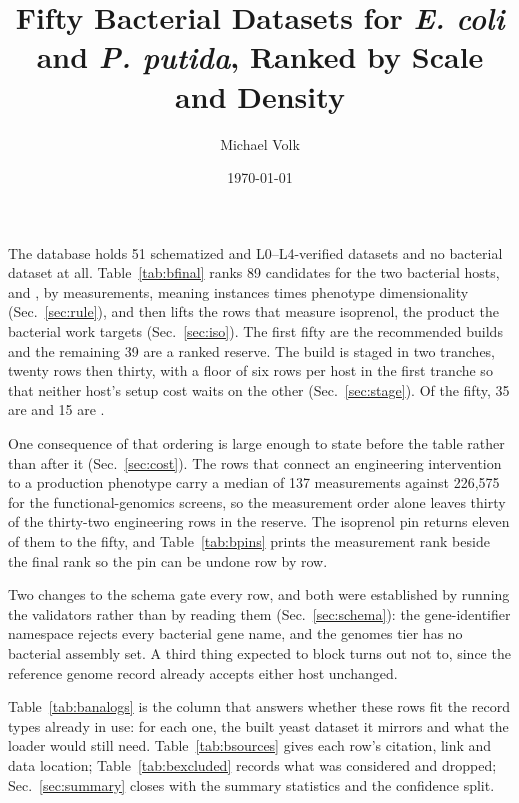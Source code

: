 \documentclass[10pt,a4paper]{article}
\title{\vspace{-1.5em}Fifty Bacterial Datasets for \emph{E. coli} and \emph{P. putida},
Ranked by Scale and Density}
\author{Michael Volk}
\date{\today}
\begin{document}
\maketitle
\thispagestyle{empty}

\noindent
The database holds 51 schematized and L0--L4-verified 
datasets and no bacterial dataset at all. Table~\ref{tab:bfinal} ranks 89 candidates for
the two bacterial hosts,  and , by
measurements, meaning instances times phenotype dimensionality (Sec.~\ref{sec:rule}), and
then lifts the rows that measure isoprenol, the product the bacterial work targets
(Sec.~\ref{sec:iso}). The first fifty are the recommended builds and the remaining 39 are
a ranked reserve. The
build is staged in two tranches, twenty rows then thirty, with a floor of six rows per
host in the first tranche so that neither host's setup cost waits on the other
(Sec.~\ref{sec:stage}). Of the fifty, 35 are  and 15 are .

One consequence of that ordering is large enough to state before the table rather than
after it (Sec.~\ref{sec:cost}). The rows that connect an engineering intervention to a
production phenotype carry a median of 137 measurements against 226,575 for the
functional-genomics screens, so the measurement order alone leaves thirty of the
thirty-two engineering rows in the reserve. The isoprenol pin returns eleven of them to
the fifty, and Table~\ref{tab:bpins} prints the measurement rank beside the final rank so
the pin can be undone row by row.

Two changes to the schema gate every row, and both were established by running the
validators rather than by reading them (Sec.~\ref{sec:schema}): the gene-identifier
namespace rejects every bacterial gene name, and the genomes tier has no bacterial
assembly set. A third thing expected to block turns out not to, since the reference genome
record already accepts either host unchanged.

Table~\ref{tab:banalogs} is the column that answers whether these rows fit the record
types already in use: for each one, the built yeast dataset it mirrors and what the
loader would still need. Table~\ref{tab:bsources} gives each row's citation, link and
data location; Table~\ref{tab:bexcluded} records what was considered and dropped;
Sec.~\ref{sec:summary} closes with the summary statistics and the confidence split.

\vspace{0.5em}
\tccontents
\clearpage








\end{document}
